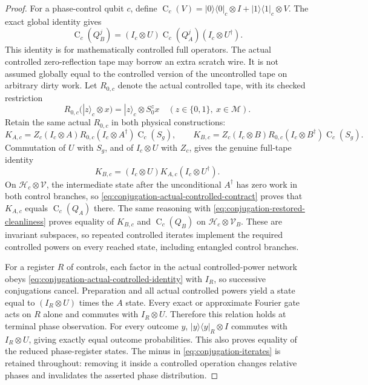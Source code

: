 \documentclass[11pt]{article}
\begin{document}
\begin{proof}
For a phase-control qubit $c$, define
$\operatorname{C}_c(V)=|0\rangle\langle0|_c\otimes I+
|1\rangle\langle1|_c\otimes V$. The exact global identity gives
\begin{equation}
 \operatorname{C}_c(Q_B^j)
 =(I_c\otimes U)\operatorname{C}_c(Q_A^j)(I_c\otimes U^\dagger).
 \label{eq:conjugation-controlled}
\end{equation}
This identity is for mathematically controlled full operators. The
actual controlled zero-reflection tape may borrow an extra scratch
wire. It is not assumed globally equal to the controlled version of
the uncontrolled tape on arbitrary dirty work. Let $R_{0,c}$ denote
the actual controlled tape, with its checked restriction
\begin{equation}
 R_{0,c}(|z\rangle_c\otimes x)
 =|z\rangle_c\otimes S_0^z x
 \quad(z\in\{0,1\},\ x\in\mathcal M).
 \label{eq:conjugation-actual-controlled-contract}
\end{equation}
Retain the same actual $R_{0,c}$ in both physical constructions:
\begin{equation}
 K_{A,c}=Z_c(I_c\otimes A)R_{0,c}(I_c\otimes A^\dagger)
                   \operatorname C_c(S_g),\qquad
 K_{B,c}=Z_c(I_c\otimes B)R_{0,c}(I_c\otimes B^\dagger)
                   \operatorname C_c(S_g).
 \label{eq:conjugation-actual-controlled-iterates}
\end{equation}
Commutation of $U$ with $S_g$, and of $I_c\otimes U$ with $Z_c$,
gives the genuine full-tape identity
\begin{equation}
 K_{B,c}=(I_c\otimes U)K_{A,c}(I_c\otimes U^\dagger).
 \label{eq:conjugation-actual-controlled-identity}
\end{equation}
On $\mathcal H_c\otimes\mathcal V$, the intermediate state after
the unconditional $A^\dagger$ has zero work in both control branches,
so \eqref{eq:conjugation-actual-controlled-contract} proves that
$K_{A,c}$ equals $\operatorname C_c(Q_A)$ there. The same reasoning
with \eqref{eq:conjugation-restored-cleanliness} proves equality of
$K_{B,c}$ and $\operatorname C_c(Q_B)$ on
$\mathcal H_c\otimes\mathcal V_B$. These are invariant subspaces,
so repeated controlled iterates implement the required controlled
powers on every reached state, including entangled control branches.

For a register $R$ of controls, each factor in the actual
controlled-power network obeys
\eqref{eq:conjugation-actual-controlled-identity} with $I_R$, so
successive conjugations cancel. Preparation and all actual controlled
powers yield a state equal to $(I_R\otimes U)$ times the $A$ state.
Every exact or approximate Fourier gate acts on $R$ alone and commutes
with $I_R\otimes U$. Therefore this relation holds at terminal phase
observation. For every outcome $y$,
$|y\rangle\langle y|_R\otimes I$ commutes with $I_R\otimes U$,
giving exactly equal outcome probabilities. This also proves equality
of the reduced phase-register states. The minus in
\eqref{eq:conjugation-iterates} is retained throughout: removing it
inside a controlled operation changes relative phases and invalidates
the asserted phase distribution.
\end{proof}
\end{document}
